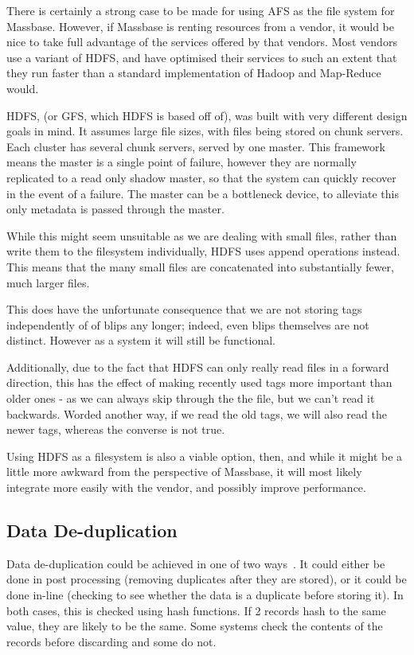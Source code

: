 \documentclass[12pt,a4paper]{article}
\begin{document}
There is certainly a strong case to be made for using AFS as the file system for Massbase. However, if Massbase is renting resources from a vendor, it would be nice to take full advantage of the services offered by that vendors. Most vendors use a variant of HDFS, and have optimised their services to such an extent that they run faster than a standard implementation of Hadoop and Map-Reduce would.

HDFS, (or GFS, which HDFS is based off of), was built with very different design goals in mind. It assumes large file sizes, with files being stored on chunk servers. Each cluster has several chunk servers, served by one master. This framework means the master is a single point of failure, however they are normally replicated to a read only shadow master, so that the system can quickly recover in the event of a failure. The master can be a bottleneck device, to alleviate this only metadata is passed through the master.

While this might seem unsuitable as we are dealing with small files, rather than write them to the filesystem individually, HDFS uses append operations instead. This means that the many small files are concatenated into substantially fewer, much larger files.

This does have the unfortunate consequence that we are not storing tags independently of of blips any longer; indeed, even blips themselves are not distinct. However as a system it will still be functional.

Additionally, due to the fact that HDFS can only really read files in a forward direction, this has the effect of making recently used tags more important than older ones - as we can always skip through the the file, but we can't read it backwards. Worded another way, if we read the old tags, we will also read the newer tags, whereas the converse is not true.

Using HDFS as a filesystem is also a viable option, then, and while it might be a little more awkward from the perspective of Massbase, it will most likely integrate more easily with the vendor, and possibly improve performance.

\subsection{Data De-duplication}
Data de-duplication could be achieved in one of two ways~\cite{buc}. It could either be done in post processing (removing duplicates after they are stored), or it could be done in-line (checking to see whether the data is a duplicate before storing it). In both cases, this is checked using hash functions. If 2 records hash to the same value, they are likely to be the same. Some systems check the contents of the records before discarding and some do not.
\end{document}

